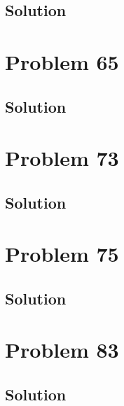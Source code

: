 \documentclass[12pt]{article}
\begin{document}
        \subsection{Solution}

    \pagebreak
    \section{Problem 65}

        \subsection{Solution}

    \pagebreak
    \section{Problem 73}

        \subsection{Solution}

    \pagebreak
    \section{Problem 75}

        \subsection{Solution}

    \pagebreak
    \section{Problem 83}

        \subsection{Solution}

    \pagebreak

    \tableofcontents
    
\end{document}

